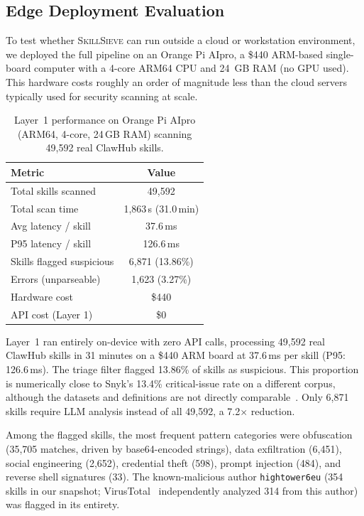 \documentclass[sigconf,nonacm]{acmart}
\begin{document}
\subsection{Edge Deployment Evaluation}

To test whether \textsc{SkillSieve} can run outside a cloud or workstation environment, we deployed the full pipeline on an Orange Pi AIpro, a \$440 ARM-based single-board computer with a 4-core ARM64 CPU and 24~GB RAM (no GPU used). This hardware costs roughly an order of magnitude less than the cloud servers typically used for security scanning at scale.

\begin{table}[!htbp]
\centering
\caption{Layer~1 performance on Orange Pi AIpro (ARM64, 4-core, 24\,GB RAM) scanning 49,592 real ClawHub skills.}
\label{tab:edge}
\begin{tabular}{lc}
\toprule
\textbf{Metric} & \textbf{Value} \\
\midrule
Total skills scanned & 49,592 \\
Total scan time & 1,863\,s (31.0\,min) \\
Avg latency / skill & 37.6\,ms \\
P95 latency / skill & 126.6\,ms \\
Skills flagged suspicious & 6,871 (13.86\%) \\
Errors (unparseable) & 1,623 (3.27\%) \\
Hardware cost & \$440 \\
API cost (Layer 1) & \$0 \\
\bottomrule
\end{tabular}
\end{table}

Layer~1 ran entirely on-device with zero API calls, processing 49,592 real ClawHub skills in 31 minutes on a \$440 ARM board at 37.6\,ms per skill (P95: 126.6\,ms). The triage filter flagged 13.86\% of skills as suspicious. This proportion is numerically close to Snyk's 13.4\% critical-issue rate on a different corpus, although the datasets and definitions are not directly comparable~\cite{snyk2026toxicskills}. Only 6,871 skills require LLM analysis instead of all 49,592, a 7.2$\times$ reduction.

Among the flagged skills, the most frequent pattern categories were obfuscation (35,705 matches, driven by base64-encoded strings), data exfiltration (6,451), social engineering (2,652), credential theft (598), prompt injection (484), and reverse shell signatures (33). The known-malicious author \texttt{hightower6eu} (354 skills in our snapshot; VirusTotal~\cite{virustotal2026} independently analyzed 314 from this author) was flagged in its entirety.
\end{document}
